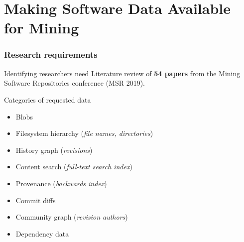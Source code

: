 \documentclass[aspectratio=169,xcolor=table]{beamer}
\begin{document}

    \section{Making Software Data Available for Mining}

    \begin{frame}
        \frametitle{Research requirements}

        \begin{block}{Identifying researchers need}
            Literature review of \textbf{54 papers} from the Mining Software
            Repositories conference (MSR 2019).
        \end{block}

        \begin{block}{Categories of requested data}
            \begin{itemize}
                \item Blobs
                \item Filesystem hierarchy (\emph{file names, directories})
                \item History graph (\emph{revisions})
                \item Content search (\emph{full-text search index})
                \item Provenance (\emph{backwards index})
                \item Commit diffs
                \item Community graph (\emph{revision authors})
                \item Dependency data
            \end{itemize}
        \end{block}
    \end{frame}
\end{document}
